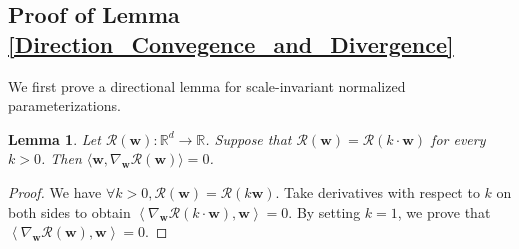 \documentclass[pdflatex,sn-basic]{sn-jnl}%
\theoremstyle{thmstyleone}%
\newtheorem{lemma}[theorem]{Lemma}
\begin{document}
\begin{appendices}

\section{Proof of Lemma \ref{Direction_Convegence_and_Divergence}}\label{Proof_of_Lemma_direction}

We first prove a directional lemma for scale-invariant normalized parameterizations. 
\begin{lemma}\label{Orthogonal}
  Let $\mathcal{R} \left(\mathbf{w}\right): \mathbb{R}^{d} \rightarrow \mathbb{R}$.
  Suppose that $\mathcal{R} \left(\mathbf{w}\right) = \mathcal{R} \left(k \cdot \mathbf{w}\right)$ for every $k > 0$.
  Then $\langle \mathbf{w}, \nabla_\mathbf{w} \mathcal{R} \left( \mathbf{w} \right)\rangle = 0$.
\end{lemma}
\begin{proof}
  We have
  $\forall k > 0, \mathcal{R}\left(\mathbf{w}\right) = \mathcal{R}\left(k \mathbf{w}\right)$. 
  Take derivatives with respect to $k$ on both sides to obtain
  $
    \left\langle 
       \nabla_{\mathbf{w}} \mathcal{R}\left(k \cdot \mathbf{w}\right),
      \mathbf{w}
    \right\rangle =  0.
  $
  By setting $k = 1$, we prove that $
  \left\langle 
      \nabla_{\mathbf{w}} \mathcal{R}\left(\mathbf{w}\right), \mathbf{w}
  \right\rangle = 0$. 
\end{proof}


\end{appendices}
\end{document}
